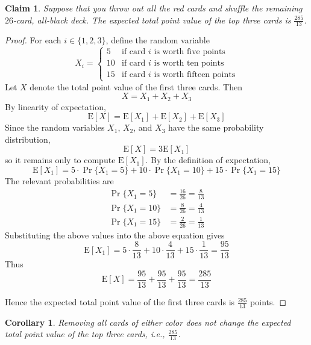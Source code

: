 \documentclass{article}
\newtheorem{claim}{Claim}
\newtheorem*{corollary}{Corollary}
\begin{document}
\begin{claim}
    Suppose that you throw out all the red cards and shuffle the remaining $26$-card, all-black deck. 
    The expected total point value of the top three cards is $\frac{285}{13}$.
\end{claim}

\begin{proof}
    For each $i \in \{1, 2, 3\}$, define the random variable 
    \[
    X_i =
    \begin{cases}
        5 & \text{if card } i \text{ is worth five points} \\
        10 & \text{if card } i \text{ is worth ten points} \\
        15 & \text{if card } i \text{ is worth fifteen points}
    \end{cases}
    \]
    Let $X$ denote the total point value of the first three cards. Then
    \[
    X = X_1 + X_2 + X_3
    \]
    By linearity of expectation,
    \[
    \mathrm{E}[X] = \mathrm{E}[X_1] + \mathrm{E}[X_2] + \mathrm{E}[X_3]
    \]
    Since the random variables $X_1$, $X_2$, and $X_3$ have the same probability distribution, 
    \[
    \mathrm{E}[X] = 3\mathrm{E}[X_1]
    \]
    so it remains only to compute $\mathrm{E}[X_1]$. By the definition of expectation, 
    \[
    \mathrm{E}[X_1] = 5 \cdot \Pr\{X_1 = 5\} + 10 \cdot \Pr\{X_1 = 10\} + 15 \cdot \Pr\{X_1 = 15\}
    \]
    The relevant probabilities are
    \[
    \begin{aligned}
        \Pr\{X_1 = 5\} &= \frac{16}{26} = \frac{8}{13} \\[4pt]
        \Pr\{X_1 = 10\} &= \frac{8}{26} = \frac{4}{13} \\[4pt]
        \Pr\{X_1 = 15\} &= \frac{2}{26} = \frac{1}{13}
    \end{aligned}
    \]
    Substituting the above values into the above equation gives 
    \[
    \mathrm{E}[X_1] = 5 \cdot \frac{8}{13} + 10 \cdot \frac{4}{13} + 15 \cdot \frac{1}{13} = \frac{95}{13}
    \]
    Thus 
    \[
    \mathrm{E}[X] = \frac{95}{13} + \frac{95}{13} + \frac{95}{13} = \frac{285}{13}
    \]

    \medskip

    Hence the expected total point value of the first three cards is $\frac{285}{13}$ points.
\end{proof}

\begin{corollary}
    Removing all cards of either color does not change the expected total point value of the top 
    three cards, i.e., $\frac{285}{13}$.
\end{corollary}
\end{document}
